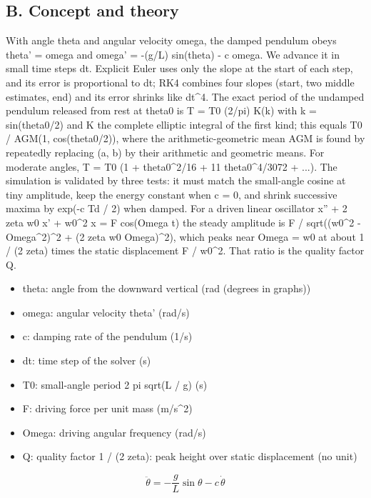 \documentclass[11pt,a4paper]{article}
\begin{document}
\subsection*{B. Concept and theory}
With angle theta and angular velocity omega, the damped pendulum obeys theta' = omega and omega' = -(g/L) sin(theta) - c omega. We advance it in small time steps dt. Explicit Euler uses only the slope at the start of each step, and its error is proportional to dt; RK4 combines four slopes (start, two middle estimates, end) and its error shrinks like dt\textasciicircum{}4. The exact period of the undamped pendulum released from rest at theta0 is T = T0 (2/pi) K(k) with k = sin(theta0/2) and K the complete elliptic integral of the first kind; this equals T0 / AGM(1, cos(theta0/2)), where the arithmetic-geometric mean AGM is found by repeatedly replacing (a, b) by their arithmetic and geometric means. For moderate angles, T = T0 (1 + theta0\textasciicircum{}2/16 + 11 theta0\textasciicircum{}4/3072 + ...). The simulation is validated by three tests: it must match the small-angle cosine at tiny amplitude, keep the energy constant when c = 0, and shrink successive maxima by exp(-c Td / 2) when damped. For a driven linear oscillator x'' + 2 zeta w0 x' + w0\textasciicircum{}2 x = F cos(Omega t) the steady amplitude is F / sqrt((w0\textasciicircum{}2 - Omega\textasciicircum{}2)\textasciicircum{}2 + (2 zeta w0 Omega)\textasciicircum{}2), which peaks near Omega = w0 at about 1 / (2 zeta) times the static displacement F / w0\textasciicircum{}2. That ratio is the quality factor Q.

\begin{itemize}[nosep]
\item theta: angle from the downward vertical (rad (degrees in graphs))
\item omega: angular velocity theta' (rad/s)
\item c: damping rate of the pendulum (1/s)
\item dt: time step of the solver (s)
\item T0: small-angle period 2 pi sqrt(L / g) (s)
\item F: driving force per unit mass (m/s\textasciicircum{}2)
\item Omega: driving angular frequency (rad/s)
\item Q: quality factor 1 / (2 zeta): peak height over static displacement (no unit)
\end{itemize}

\begin{equation*}
\ddot\theta = -\frac{g}{L}\sin\theta - c\,\dot\theta
\end{equation*}
\end{document}
